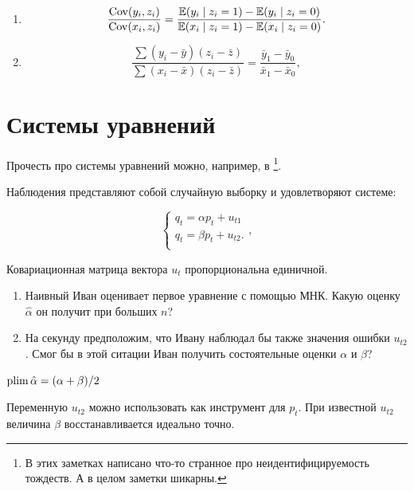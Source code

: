 \begin{problem}
\begin{enumerate}
  \item {} 
  \[
  \frac{\operatorname{Cov}(y_i, z_i)}{\operatorname{Cov}(x_i, z_i)} = \frac{\operatorname{\mathbb{E}}(y_i \mid z_i = 1) - \operatorname{\mathbb{E}}(y_i \mid z_i = 0)}{\operatorname{\mathbb{E}}(x_i \mid z_i = 1) - \operatorname{\mathbb{E}}(x_i \mid z_i = 0)}.
  \]
  \item {} 
  \[
  \frac{\sum (y_i - \bar y)(z_i - \bar z)}{\sum (x_i - \bar x)(z_i - \bar z)} = \frac{\bar y_1 - \bar y_0}{\bar x_1 - \bar x_0},  
  \]
\end{enumerate}
\begin{sol}
\end{sol}
\end{problem}



\section{Системы уравнений}

Прочесть про системы уравнений можно, например, в \cite{pierse2021notes}\footnote{В этих заметках написано что-то странное про неидентифицируемость тождеств. А в целом заметки шикарны.}. 


\begin{problem}

Наблюдения представляют собой случайную выборку и удовлетворяют системе:

  \[
  \begin{cases}
    q_t = \alpha p_t + u_{t1} \\
    q_t = \beta p_t + u_{t2}. \\
  \end{cases},
  \]

  Ковариационная матрица вектора $u_t$ пропорциональна единичной.


  \begin{enumerate}
    \item Наивный Иван оценивает первое уравнение с помощью МНК. Какую оценку $\hat\alpha$ он получит при больших $n$?
    \item На секунду предположим, что Ивану наблюдал бы также значения ошибки $u_{t2}$. 
    Смог бы в этой ситации Иван получить состоятельные оценки $\alpha$ и $\beta$?
  \end{enumerate}


\begin{sol}
$\operatorname*{plim} \hat \alpha = (\alpha + \beta)/2$

Переменную $u_{t2}$ можно использовать как инструмент для $p_t$. 
При известной $u_{t2}$ величина $\beta$ восстанавливается идеально точно. 
\end{sol}
\end{problem}




